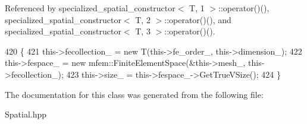 Referenced by specialized\+\_\+spatial\+\_\+constructor$<$ T, 1 $>$\+::operator()(), specialized\+\_\+spatial\+\_\+constructor$<$ T, 2 $>$\+::operator()(), and specialized\+\_\+spatial\+\_\+constructor$<$ T, 3 $>$\+::operator()().


\begin{DoxyCode}
420                                                              \{
421   this->fecollection\_ = \textcolor{keyword}{new} T(this->fe\_order\_, this->dimension\_);
422   this->fespace\_ = \textcolor{keyword}{new} mfem::FiniteElementSpace(&this->mesh\_, this->fecollection\_);
423   this->size\_ = this->fespace\_->GetTrueVSize();
424 \}
\end{DoxyCode}


The documentation for this class was generated from the following file\+:\begin{DoxyCompactItemize}
\item 
Spatial.\+hpp\end{DoxyCompactItemize}
